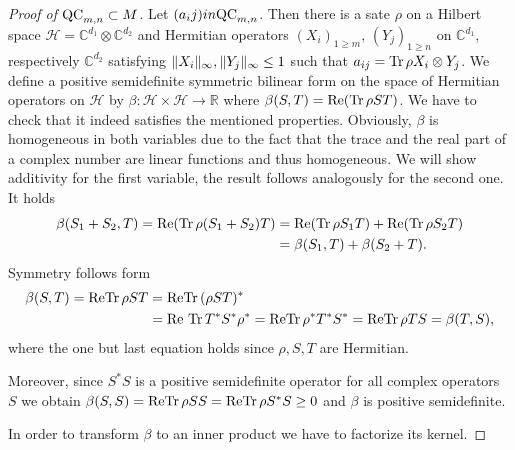 \begin{proof}[Proof of $ \textup{QC}_{m,n} \subset M $]
	Let $ (a_ij) in \textup{QC}_{m,n} $. Then there is a sate $ \rho $ on a Hilbert space $ \mathcal{H} = \mathbb{C}^{d_1} \otimes\mathbb{C}^{d_2} $ and Hermitian operators $ (X_i)_{1 \ge m}, \, (Y_j)_{1 \ge n} $ on $ \mathbb{C}^{d_1} $, respectively $ \mathbb{C}^{d_2} $ satisfying $  \Vert {X_i} \Vert_{\infty},  \Vert {Y_j} \Vert_{\infty} \le 1 $ such that 
	$ a_{ij} = \text{Tr} \, {\rho X_i \otimes Y_j}  $.
	We define a positive semidefinite symmetric bilinear form on the space of Hermitian operators on $ \mathcal{H} $ by 
	$ \beta: \mathcal{H} \times \mathcal{H} \to \mathbb{R} $ where $ \beta(S,T) =\textup{Re}( \text{Tr} \, {\rho ST} ) $.
	We have to check that it indeed satisfies the mentioned properties. 
	Obviously, $ \beta $ is homogeneous in both variables due to the fact that the trace and the real part of a complex number are linear functions and thus homogeneous. We will show additivity for the first variable, the result follows analogously for the second one. It holds
	\begin{align*}
		\beta(S_1+S_2,T) = \textup{Re}(\text{Tr} \, {\rho(S_1+S_2)T} ) &= \textup{Re}(\text{Tr} \, {\rho S_1T} ) + \textup{Re}(\text{Tr} \, {\rho S_2T} ) \\
		&= \beta(S_1,T)+ \beta(S_2+T).
	\end{align*}
	Symmetry follows form 
	\begin{align*}
		\beta(S,T)= \textup{Re}\text{Tr} \, {\rho ST}  &=\textup{Re}\text{Tr} \, {(\rho ST)^*}   \\
		&= \textup{Re \ensuremath{\text{Tr} \, {T^*S^* \rho^*} }} = \textup{Re} \text{Tr} \, {\rho^* T^*S^*}  = \textup{Re} \text{Tr} \, {\rho T S}  = \beta(T,S),
	\end{align*}
	where the one but last equation holds since $ \rho,S,T $ are Hermitian.
	
	Moreover, since $ S^*S $ is a positive semidefinite operator for all complex operators $ S $ we obtain $ \beta(S,S) = \textup{Re}\text{Tr} \, {\rho SS}  = \textup{Re} \text{Tr} \, {\rho S^*S}  \ge 0 $ and $ \beta $ is positive semidefinite. 
	
	In order to transform $ \beta $ to an inner product we have to factorize its kernel. 
\end{proof}
